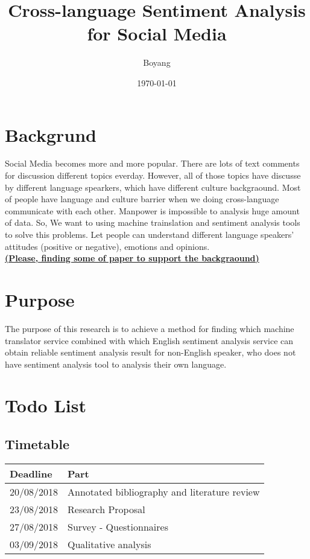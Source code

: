 \documentclass[9pt]{article}
\author{Boyang}
\date{\today}
\title{Cross-language Sentiment Analysis for Social Media}
\begin{document}
\maketitle

\section{Backgrund}
Social Media becomes more and more popular. There are lots of text comments for discussion different topics everday.
However, all of those topics have discusse by different language spearkers, which have different culture backgraound.
Most of people have language and culture barrier when we doing cross-language communicate with each other.
Manpower is impossible to analysis huge amount of data. So,
We want to using machine trainslation and sentiment analysis tools to solve this problems.
Let people can understand different language speakers' attitudes (positive or negative), emotions and opinions.\\
\underline{\textbf{(Please, finding some of paper to support the backgraound)}}
\section{Purpose}
The purpose of this research is to achieve a method for finding which machine translator service combined with which English sentiment analysis service can obtain reliable sentiment analysis result for non-English speaker, who does not have sentiment analysis tool to analysis their own language.

\section{Todo List}
\subsection{Timetable}
\begin{center}

\begin{tabularx}{\textwidth}{X|X}
  \textbf{Deadline} & \textbf{Part} \\
\hline
20/08/2018 & Annotated bibliography and literature review\\
23/08/2018 & Research Proposal\\
27/08/2018 & Survey - Questionnaires\\
03/09/2018 & Qualitative analysis\\
\end{tabularx}

\end{center}
\end{document}
